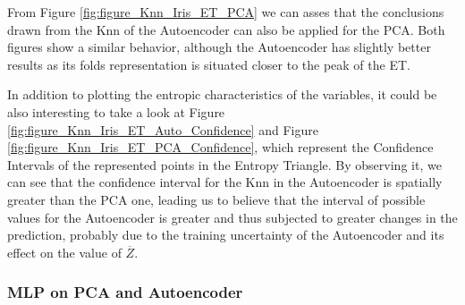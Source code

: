 From Figure \ref{fig:figure_Knn_Iris_ET_PCA} we can asses that the conclusions drawn from the Knn of the Autoencoder can also be applied for the PCA. Both figures show a similar behavior, although the Autoencoder has slightly better results as its folds representation is situated closer to the peak of the ET.\par

In addition to plotting the entropic characteristics of the variables, it could be also interesting to take a look at Figure \ref{fig:figure_Knn_Iris_ET_Auto_Confidence} and Figure \ref{fig:figure_Knn_Iris_ET_PCA_Confidence}, which represent the Confidence Intervals of the represented points in the Entropy Triangle. By observing it, we can see that the confidence interval for the Knn in the Autoencoder is spatially greater than the PCA one, leading us to believe that the interval of possible values for the Autoencoder is greater and thus subjected to greater changes in the prediction, probably due to the training uncertainty of the Autoencoder and its effect on the value of $\overline{Z}$. 




\subsubsection{	MLP on PCA and Autoencoder}

